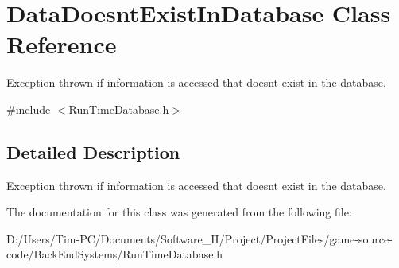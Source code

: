 \hypertarget{class_data_doesnt_exist_in_database}{}\section{Data\+Doesnt\+Exist\+In\+Database Class Reference}
\label{class_data_doesnt_exist_in_database}


Exception thrown if information is accessed that doesnt exist in the database.  




{\ttfamily \#include $<$Run\+Time\+Database.\+h$>$}



\subsection{Detailed Description}
Exception thrown if information is accessed that doesnt exist in the database. 

The documentation for this class was generated from the following file\+:\begin{DoxyCompactItemize}
\item 
D\+:/\+Users/\+Tim-\/\+P\+C/\+Documents/\+Software\+\_\+\+I\+I/\+Project/\+Project\+Files/game-\/source-\/code/\+Back\+End\+Systems/Run\+Time\+Database.\+h\end{DoxyCompactItemize}
